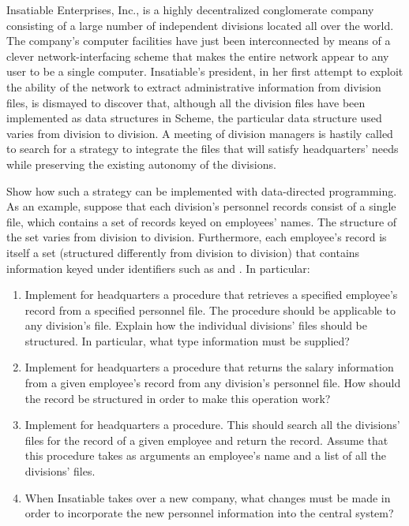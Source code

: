 


\begin{exercise}
	\label{Exercise 2.74}
	Insatiable Enterprises, Inc., is a highly decentralized conglomerate company consisting of a large number of independent divisions located all over the world.
	The company’s computer facilities have just been interconnected by means of a clever network-interfacing scheme that makes the entire network appear to any user to be a single computer.
	Insatiable’s president, in her first attempt to exploit the ability of the network to extract administrative information from division files, is dismayed to discover that, although all the division files have been implemented as data structures in Scheme, the particular data structure used varies from division to division.
	A meeting of division managers is hastily called to search for a strategy to integrate the files that will satisfy headquarters’ needs while preserving the existing autonomy of the divisions.

	Show how such a strategy can be implemented with data-directed programming.
	As an example, suppose that each division’s personnel records consist of a single file, which contains a set of records keyed on employees’ names.
	The structure of the set varies from division to division.
	Furthermore, each employee’s record is itself a set (structured differently from division to division) that contains information keyed under identifiers such as  and .
	In particular:
	\begin{enumerate}[label = \alph*., leftmargin = *]

		\item
			Implement for headquarters a  procedure that retrieves a specified employee’s record from a specified personnel file.
			The procedure should be applicable to any division’s file.
			Explain how the individual divisions’ files should be structured.
			In particular, what type information must be supplied?

		\item
			Implement for headquarters a  procedure that returns the salary information from a given employee’s record from any division’s personnel file.
			How should the record be structured in order to make this operation work?

		\item
			Implement for headquarters a  procedure.
			This should search all the divisions’ files for the record of a given employee and return the record.
			Assume that this procedure takes as arguments an employee’s name and a list of all the divisions’ files.

		\item
			When Insatiable takes over a new company, what changes must be made in order to  incorporate the new personnel information into the central system?

	\end{enumerate}
\end{exercise}




